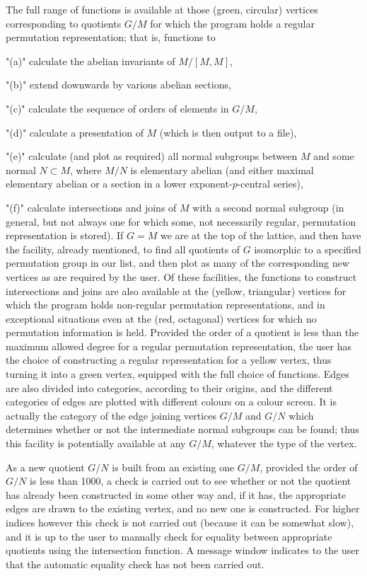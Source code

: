 The full range of functions is available at those (green, circular) vertices 
corresponding to quotients $G/M$ for which the program holds a regular 
permutation representation; that is, functions to
\roster
\item"(a)" calculate the abelian invariants of $M/[M,M]$, 
\item"(b)" extend downwards by various abelian sections, 
\item"(c)" calculate the sequence of orders of elements in $G/M$, 
\item"(d)" calculate a presentation of $M$ (which is then output to a file), 
\item"(e)" calculate (and plot as required) all normal subgroups between $M$ 
and some normal $N \subset M$, where $M/N$ is elementary abelian (and 
either maximal elementary abelian or a section in a
lower exponent-$p$-central series),
\item"(f)" calculate intersections and joins of $M$ with a second normal 
subgroup (in general, but not always one for which some, not necessarily 
regular, permutation representation is stored). 
\endroster
If $G=M$ we are at the top of the 
lattice, and then have
the facility, already mentioned, to find all quotients of $G$ isomorphic to a
specified  permutation group in our list, and then plot as many of the
corresponding new vertices as are required by the user.
Of these facilities, the functions to construct intersections and joins are
also available at the (yellow, triangular) vertices for which the program 
holds non-regular
permutation representations, and in exceptional situations even at
the (red, octagonal) vertices for which no permutation information is held.
Provided the order of a quotient is less than the maximum allowed degree for a
regular permutation representation, the user has the choice of 
constructing a regular 
representation  for a yellow vertex, thus turning it into a green vertex, 
equipped with the full choice of functions.
Edges are also divided into categories, according to their origins,
and the different categories of edges are plotted with different
colours on a colour screen. It is actually the category of the edge joining
vertices $G/M$ and $G/N$ which determines whether or not  the intermediate
normal subgroups can be found; thus this facility is potentially available at
any $G/M$, whatever the type of the vertex.
 
As a new quotient $G/N$ is built from an existing one $G/M$, provided the
order of $G/N$ is less than 1000, a check is carried out to see whether or
not the quotient has already been constructed in some other way and, if it
has, the appropriate edges are drawn to the existing vertex, and no new one 
is constructed. For higher indices however this check is not carried out
(because it can be somewhat slow), and it is up to the user to manually
check for equality between appropriate quotients using the intersection 
function. A message window indicates to the user that the automatic 
equality check has not been carried out.

